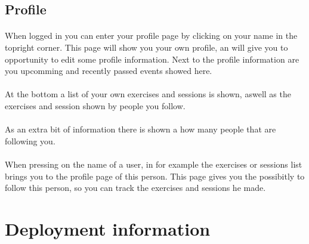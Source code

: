 \documentclass[11pt,a4paper]{scrartcl}
\begin{document}
\subsection{Profile}
\paragraph{}When logged in you can enter your profile page by clicking on your name in the topright corner. This page will show you your own profile, an will give you to opportunity to edit some profile information. Next to the profile information are you upcomming and recently passed events showed here.
\paragraph{}At the bottom a list of your own exercises and sessions is shown, aswell as the exercises and session shown by people you follow.
\paragraph{}As an extra bit of information there is shown a how many people that are following you.
\paragraph{}When pressing on the name of a user, in for example the exercises or sessions list brings you to the profile page of this person. This page gives you the possibitly to follow this person, so you can track the exercises and sessions he made.
\section{Deployment information}


\newpage        %

\newpage
\printindex                             %
\end{document}
